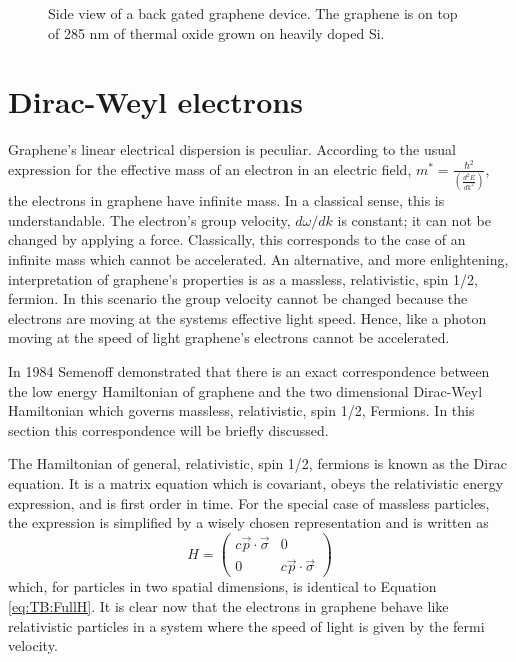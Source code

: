 \begin{figure}
	\begin{center}
	
	\end{center}
	\caption{\label{fig:TB:FET} Side view of a back gated graphene device.  The graphene is on top of 285 nm of thermal oxide grown on heavily doped Si. }	
\end{figure}

\section{Dirac-Weyl electrons}
Graphene's linear electrical dispersion is peculiar.
According to the usual expression for the effective mass of an electron in an electric field, $m^*=\frac{\hbar^2}{\left(\frac{d^2 E}{d k^2}\right)}$, \cite{Kittel2005} the electrons in graphene have infinite mass.
In a classical sense, this is understandable.
The electron's group velocity, $d \omega/d k$ is constant; it can not be changed by applying a force.
Classically, this corresponds to the case of an infinite mass which cannot be accelerated.
An alternative, and more enlightening, interpretation of graphene's properties is as a massless, relativistic, spin 1/2, fermion.
In this scenario the group velocity cannot be changed because the electrons are moving at the systems effective light speed.
Hence, like a photon moving at the speed of light graphene's electrons cannot be accelerated.

In 1984 Semenoff demonstrated that there is an exact correspondence between the low energy Hamiltonian of graphene and the two dimensional Dirac-Weyl Hamiltonian \cite{Semenoff1984} which governs massless, relativistic, spin 1/2, Fermions.
In this section this correspondence will be briefly discussed.

The Hamiltonian of general, relativistic, spin 1/2, fermions is known as the Dirac equation.
It is a matrix equation which is covariant, obeys the relativistic energy expression, and is first order in time.
For the special case of massless particles, the expression is simplified by a wisely chosen representation and is written as
\begin{equation*}
	H=\left( \begin{array}{cc}
			c \vec{p} \cdot \vec{\sigma}              & 0\\
			0              & c \vec{p} \cdot \vec{\sigma}			   	            			\end{array} \right)
\end{equation*}
which, for particles in two spatial dimensions, is identical to Equation \ref{eq:TB:FullH}.
It is clear now that the electrons in graphene behave like relativistic particles in a system where the speed of light is given by the fermi velocity.

